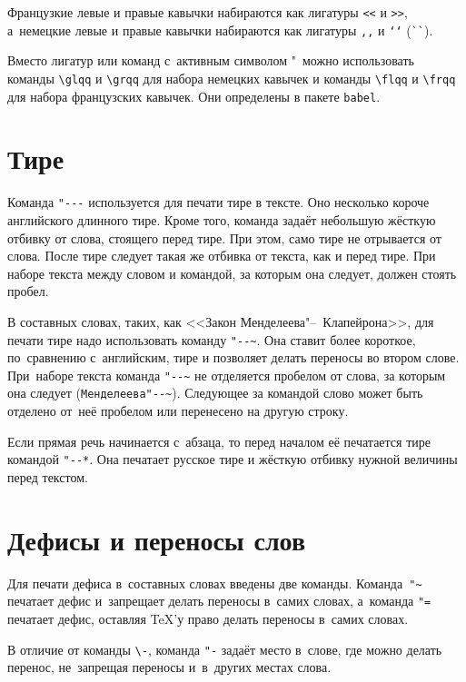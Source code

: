 Французкие левые и правые кавычки набираются
как лигатуры \verb|<<| и \verb|>>|, а~немецкие левые и правые кавычки набираются как лигатуры \verb|,,| и \verb|‘‘| (\verb|``|).

Вместо лигатур или команд с~активным символом "\ можно использовать команды \verb|\glqq| и \verb|\grqq| для набора немецких кавычек и команды \verb|\flqq| и \verb|\frqq| для набора французских кавычек. Они определены в пакете \verb|babel|.

\section{Тире}
Команда \verb|"---| используется для печати тире в тексте. Оно несколько короче английского длинного тире. Кроме того, команда задаёт небольшую жёсткую отбивку от слова, стоящего перед тире. При этом, само тире не отрывается от слова. После тире следует такая же отбивка от текста, как и перед тире. При наборе текста между словом и командой, за которым она следует, должен стоять пробел.

В составных словах, таких, как <<Закон Менделеева"--~Клапейрона>>, для печати тире надо использовать команду \verb|"--~|. Она ставит более короткое, по~сравнению с~английским, тире и позволяет делать переносы во втором слове. При~наборе текста команда \verb|"--~| не отделяется пробелом от слова, за которым она следует (\verb|Менделеева"--~|). Следующее за командой слово может быть  отделено от~неё пробелом или перенесено на другую строку.

Если прямая речь начинается с~абзаца, то перед началом её печатается тире командой
\verb|"--*|. Она печатает русское тире и жёсткую отбивку нужной величины перед текстом.

\section{Дефисы и переносы слов}
Для печати дефиса в~составных словах введены две команды. Команда~\verb|"~| печатает дефис и~запрещает делать переносы в~самих словах, а~команда \verb|"=| печатает дефис, оставляя \TeX ’у право делать переносы в~самих словах.

В отличие от команды \verb|\-|, команда \verb|"-| задаёт место в~слове, где можно делать перенос, не~запрещая переносы и~в~других местах слова.

